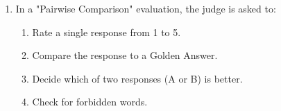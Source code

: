 \documentclass[11pt,a4paper]{article}
\begin{document}
\begin{enumerate}[leftmargin=*, label=\textbf{\#\arabic*}]
  \item In a "Pairwise Comparison" evaluation, the judge is asked to:\\
    \begin{enumerate}[label=\Alph*)]
      \item Rate a single response from 1 to 5.
      \item Compare the response to a Golden Answer.
      \item Decide which of two responses (A or B) is better.
      \item Check for forbidden words.
    \end{enumerate}

\end{enumerate}
\end{document}
